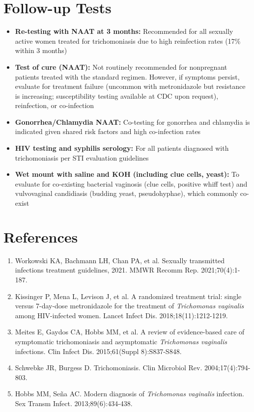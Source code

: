 \section*{Follow-up Tests}
\begin{itemize}
  \item \textbf{Re-testing with NAAT at 3 months:} Recommended for all sexually active women treated for trichomoniasis due to high reinfection rates (17\% within 3 months)
  \item \textbf{Test of cure (NAAT):} Not routinely recommended for nonpregnant patients treated with the standard regimen. However, if symptoms persist, evaluate for treatment failure (uncommon with metronidazole but resistance is increasing; susceptibility testing available at CDC upon request), reinfection, or co-infection
  \item \textbf{Gonorrhea/Chlamydia NAAT:} Co-testing for gonorrhea and chlamydia is indicated given shared risk factors and high co-infection rates
  \item \textbf{HIV testing and syphilis serology:} For all patients diagnosed with trichomoniasis per STI evaluation guidelines
  \item \textbf{Wet mount with saline and KOH (including clue cells, yeast):} To evaluate for co-existing bacterial vaginosis (clue cells, positive whiff test) and vulvovaginal candidiasis (budding yeast, pseudohyphae), which commonly co-exist
\end{itemize}

\section*{References}
\begin{enumerate}
  \item Workowski KA, Bachmann LH, Chan PA, et al. Sexually transmitted infections treatment guidelines, 2021. MMWR Recomm Rep. 2021;70(4):1-187.
  \item Kissinger P, Mena L, Levison J, et al. A randomized treatment trial: single versus 7-day-dose metronidazole for the treatment of \textit{Trichomonas vaginalis} among HIV-infected women. Lancet Infect Dis. 2018;18(11):1212-1219.
  \item Meites E, Gaydos CA, Hobbs MM, et al. A review of evidence-based care of symptomatic trichomoniasis and asymptomatic \textit{Trichomonas vaginalis} infections. Clin Infect Dis. 2015;61(Suppl 8):S837-S848.
  \item Schwebke JR, Burgess D. Trichomoniasis. Clin Microbiol Rev. 2004;17(4):794-803.
  \item Hobbs MM, Seña AC. Modern diagnosis of \textit{Trichomonas vaginalis} infection. Sex Transm Infect. 2013;89(6):434-438.
\end{enumerate}

\clearpage
